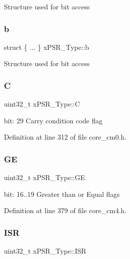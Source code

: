 Structure used for bit access \mbox{\label{unionx_p_s_r___type_a77bf98b729cf318cc11a0e21fe6ce04f}} 
\subsubsection{\texorpdfstring{b}{b}\hspace{0.1cm}{\footnotesize\ttfamily [7/7]}}
{\footnotesize\ttfamily struct \{ ... \}   x\+P\+S\+R\+\_\+\+Type\+::b}

Structure used for bit access \mbox{\label{unionx_p_s_r___type_a40213a6b5620410cac83b0d89564609d}} 
\subsubsection{\texorpdfstring{C}{C}}
{\footnotesize\ttfamily uint32\+\_\+t x\+P\+S\+R\+\_\+\+Type\+::C}

bit\+: 29 Carry condition code flag 

Definition at line 312 of file core\+\_\+cm0.\+h.

\mbox{\label{unionx_p_s_r___type_a2d0ec4ccae337c1df5658f8cf4632e76}} 
\subsubsection{\texorpdfstring{GE}{GE}}
{\footnotesize\ttfamily uint32\+\_\+t x\+P\+S\+R\+\_\+\+Type\+::\+GE}

bit\+: 16..19 Greater than or Equal flags 

Definition at line 379 of file core\+\_\+cm4.\+h.

\mbox{\label{unionx_p_s_r___type_a3e9120dcf1a829fc8d2302b4d0673970}} 
\subsubsection{\texorpdfstring{I\+SR}{ISR}}
{\footnotesize\ttfamily uint32\+\_\+t x\+P\+S\+R\+\_\+\+Type\+::\+I\+SR}

